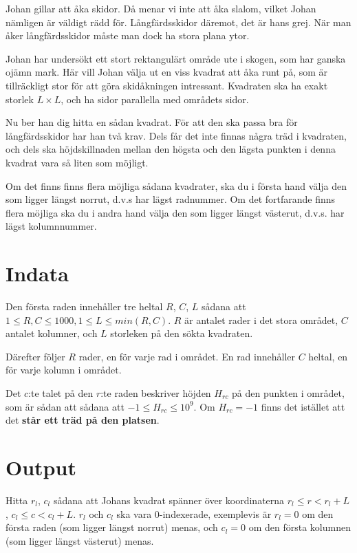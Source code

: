 Johan gillar att åka skidor.
Då menar vi inte att åka slalom, vilket Johan nämligen är väldigt rädd för.
Långfärdsskidor däremot, det är hans grej.
När man åker långfärdsskidor måste man dock ha stora plana ytor.

Johan har undersökt ett stort rektangulärt område ute i skogen, som har ganska ojämn mark.
Här vill Johan välja ut en viss kvadrat att åka runt på, som är tillräckligt stor för att göra skidåkningen intressant.
Kvadraten ska ha exakt storlek $L \times L$, och ha sidor parallella med områdets sidor.

Nu ber han dig hitta en sådan kvadrat.
För att den ska passa bra för långfärdsskidor har han två krav.
Dels får det inte finnas några träd i kvadraten, och dels ska höjdskillnaden mellan den högsta och den lägsta punkten i denna kvadrat vara så liten som möjligt.

Om det finns finns flera möjliga sådana kvadrater, ska du i första hand välja den som ligger längst norrut, d.v.s har lägst radnummer. Om det fortfarande finns flera möjliga
ska du i andra hand välja den som ligger längst västerut, d.v.s. har lägst kolumnnummer.

\section*{Indata}
Den första raden innehåller tre heltal $R$, $C$, $L$ sådana att $1\leq R,C \leq 1000, 1 \leq L \leq min(R,C)$.
$R$ är antalet rader i det stora området, $C$ antalet kolumner, och $L$ storleken på den sökta kvadraten.

Därefter följer $R$ rader, en för varje rad i området. En rad innehåller $C$ heltal, en för varje kolumn i området.

Det $c$:te talet på den $r$:te raden beskriver höjden $H_{rc}$ på den punkten i området, som är sådan att sådana att $-1 \leq H_{rc} \leq 10^9$.
Om $H_{rc} = -1$ finns det istället att det \textbf{står ett träd på den platsen}.

\section*{Output}
Hitta $r_l$, $c_l$ sådana att Johans kvadrat spänner över koordinaterna $r_l \leq r <r_l + L$, $c_l \leq c < c_l + L$. $r_l$ och $c_l$ ska vara 0-indexerade, exemplevis är $r_l = 0$ om den första raden (som ligger längst norrut) menas, och $c_l = 0$ om den första kolumnen (som ligger längst västerut) menas.

